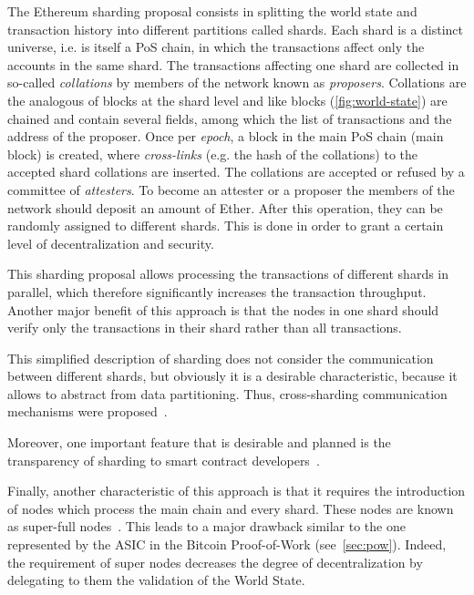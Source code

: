 The Ethereum sharding proposal consists in splitting the world state and
transaction history into different partitions called shards. Each shard is a
distinct universe, i.e. is itself a PoS chain, in which the transactions affect
only the accounts in the same shard. The transactions affecting one shard are
collected in so-called \emph{collations} by members of the network known as
\emph{proposers}. Collations are the analogous of blocks at the shard level and
like blocks (\autoref{fig:world-state}) are chained and contain several fields,
among which the list of transactions and the address of the proposer. Once per
\emph{epoch}, a block in the main PoS chain (main block) is created, where
\emph{cross-links} (e.g. the hash of the collations) to the accepted shard
collations are inserted. The collations are accepted or refused by a committee
of \emph{attesters}. To become an attester or a proposer the members of the
network should deposit an amount of Ether. After this operation, they can be
randomly assigned to different shards. This is done in order to grant a certain
level of decentralization and security.


This sharding proposal allows processing the transactions of different shards in
parallel, which therefore significantly increases the transaction throughput.
Another major benefit of this approach is that the nodes in one shard should
verify only the transactions in their shard rather than all
transactions.

This simplified description of sharding does not consider the communication
between different shards, but obviously it is a desirable characteristic,
because it allows to abstract from data partitioning.
Thus, cross-sharding communication mechanisms were
proposed~\cite{bib:sharding-faq}.

Moreover, one important feature that is desirable and planned is the
transparency of sharding to smart contract developers~\cite{bib:sharding-faq}.

Finally, another characteristic of this approach is that it requires the
introduction of nodes which process the main chain and every shard. These nodes
are known as super-full nodes~\cite{bib:sharding-faq}. This leads to a major
drawback similar to the one represented by the ASIC in the Bitcoin Proof-of-Work
(see~\autoref{sec:pow}). Indeed, the requirement of super nodes decreases the
degree of decentralization by delegating to them the validation of the World
State.
